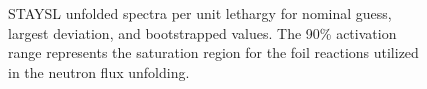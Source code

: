 \begin{figure}[!htbp]
	\centering
	\vfill
	
	\vfill
	\caption[STAYSL unfolded spectra per unit lethargy for nominal guess, largest deviation, and bootstrapped values.]{STAYSL unfolded spectra per unit lethargy for nominal guess, largest deviation, and bootstrapped values. The 90\% activation range represents the saturation region for the foil reactions utilized in the neutron flux unfolding.}
	\label{fig:unfold1}
\end{figure}

